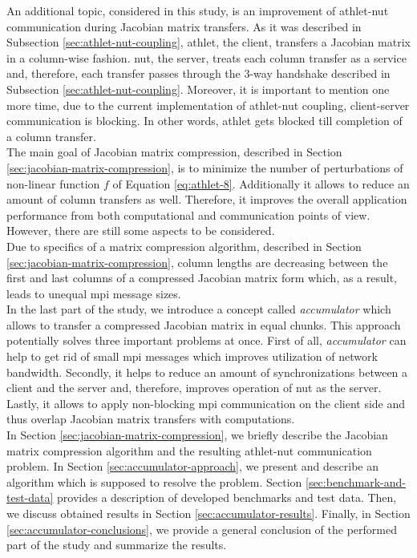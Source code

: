 An additional topic, considered in this study, is an improvement of \acrshort{athlet}-\acrshort{nut} communication during Jacobian matrix transfers. As it was described in Subsection \ref{sec:athlet-nut-coupling}, \acrshort{athlet}, the client, transfers a Jacobian matrix in a column-wise fashion. \acrshort{nut}, the server, treats each column transfer as a service and, therefore, each transfer passes through the 3-way handshake described in Subsection \ref{sec:athlet-nut-coupling}. Moreover, it is important to mention one more time,   due to the current implementation of \acrshort{athlet}-\acrshort{nut} coupling, client-server communication is blocking. In other words, \acrshort{athlet} gets blocked till completion of a column transfer. \\


The main goal of Jacobian matrix compression, described in Section \ref{sec:jacobian-matrix-compression}, is to minimize the number of perturbations of non-linear function $f$ of Equation \ref{eq:athlet-8}. Additionally it allows to reduce an amount of column transfers as well. Therefore, it improves the overall application performance from both computational and communication points of view. However, there are still some aspects to be considered.\\


Due to specifics of a matrix compression algorithm, described in Section \ref{sec:jacobian-matrix-compression}, column lengths are decreasing between the first and last columns of a compressed Jacobian matrix form which, as a result, leads to unequal \acrshort{mpi} message sizes.\\


In the last part of the study, we introduce a concept called \textit{accumulator} which allows to transfer a compressed Jacobian matrix in equal chunks. This approach potentially solves three important problems at once. First of all, \textit{accumulator} can help to get rid of small \acrshort{mpi} messages which improves utilization of network bandwidth. Secondly, it helps to reduce an amount of synchronizations between a client and the server and, therefore, improves operation of \acrshort{nut} as the server. Lastly, it allows to apply non-blocking \acrshort{mpi} communication on the client side and thus overlap Jacobian matrix transfers with computations.\\


In Section \ref{sec:jacobian-matrix-compression}, we briefly describe the Jacobian matrix compression algorithm and the resulting \acrshort{athlet}-\acrshort{nut} communication problem. In Section \ref{sec:accumulator-approach}, we present and describe an algorithm which is supposed to resolve the problem. Section \ref{sec:benchmark-and-test-data} provides a description of developed benchmarks and test data. Then, we discuss obtained results in Section \ref{sec:accumulator-results}. Finally, in Section \ref{sec:accumulator-conclusions}, we provide a general conclusion of the performed part of the study and summarize the results.\\
